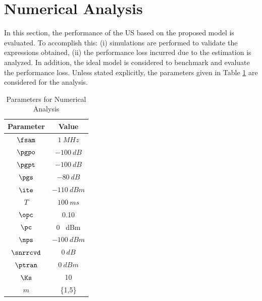 {%
\section{Numerical Analysis} \label{sec:num_ana}
In this section, the performance of the US based on the proposed model is evaluated. To accomplish this: (i) simulations are performed to validate the expressions obtained, (ii) the performance loss incurred due to the estimation is analyzed. In addition, the ideal model is considered to benchmark and evaluate the performance loss. %
Unless stated explicitly, the parameters given in Table \ref{tb:tb2} are considered for the analysis.%



\begin{table}
\renewcommand{\arraystretch}{1.4}
\caption{Parameters for Numerical Analysis}
\label{tb:tb2}
\centering
\begin{tabular}{c||c}
\hline
\bfseries Parameter & \bfseries Value \\
\hline\hline
$\fsam$  & $\SI{1}{MHz}$ \\ 
$\pgpo$ & $\SI{-100}{dB}$ \\ 
$\pgpt$ & $\SI{-100}{dB}$ \\ 
$\pgs$ & $\SI{-80}{dB}$ \\ 
$\ite$ & $\SI{-110}{dBm}$ \\ 
$T$ & $\SI{100}{ms}$ \\ 
$\opc$ & 0.10 \\ 
$\pc$ & 0 \SI{}{dBm} \\ 
$\nps$ & $\SI{-100}{dBm}$ \\ 
$\snrrcvd$ & $\SI{0}{dB}$ \\ 
$\ptran$ & $\SI{0}{dBm}$ \\ 
$\Ks$ & 10 \\ 
$m$ & \{1,5\} \\ \hline
\end{tabular}%
\end{table}

}
